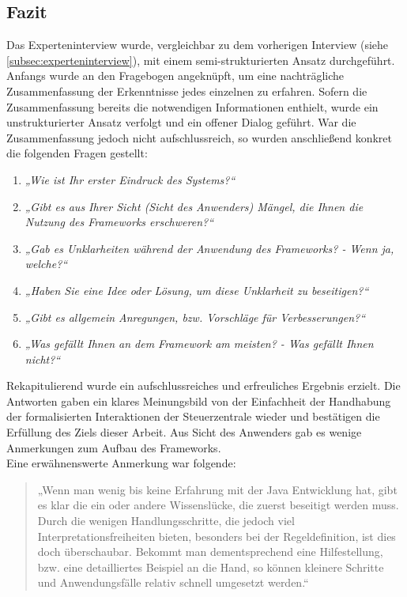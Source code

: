     \subsection{Fazit}
        Das Experteninterview wurde, vergleichbar zu dem vorherigen Interview (siehe \ref{subsec:experteninterview}), mit einem semi-strukturierten Ansatz durchgeführt. 
        Anfangs wurde an den Fragebogen angeknüpft, um eine nachträgliche Zusammenfassung der Erkenntnisse jedes einzelnen zu erfahren. Sofern die Zusammenfassung bereits 
        die notwendigen Informationen enthielt, wurde ein unstrukturierter Ansatz verfolgt und ein offener Dialog geführt. War die Zusammenfassung jedoch nicht 
        aufschlussreich, so wurden anschließend konkret die 
        folgenden Fragen gestellt: 
        \begin{enumerate}
            \item \textit{„Wie ist Ihr erster Eindruck des Systems?“}
            \item \textit{„Gibt es aus Ihrer Sicht (Sicht des Anwenders) Mängel, die Ihnen die Nutzung des Frameworks erschweren?“}
            \item \textit{„Gab es Unklarheiten während der Anwendung des Frameworks? - Wenn ja, welche?“}
            \item \textit{„Haben Sie eine Idee oder Lösung, um diese Unklarheit zu beseitigen?“}
            \item \textit{„Gibt es allgemein Anregungen, bzw. Vorschläge für Verbesserungen?“}
            \item \textit{„Was gefällt Ihnen an dem Framework am meisten? - Was gefällt Ihnen nicht?“}
        \end{enumerate} 
        Rekapitulierend wurde ein aufschlussreiches und erfreuliches Ergebnis erzielt. Die Antworten gaben ein klares Meinungsbild von der Einfachheit der 
        Handhabung der formalisierten Interaktionen der Steuerzentrale wieder und bestätigen die Erfüllung des Ziels dieser Arbeit. 
        Aus Sicht des Anwenders gab es wenige Anmerkungen zum Aufbau des Frameworks. 
        \\
        Eine erwähnenswerte Anmerkung war folgende:
        \begin{quote}
            „Wenn man wenig bis keine Erfahrung mit der Java Entwicklung hat, gibt es klar die ein oder andere Wissenslücke, die zuerst beseitigt werden muss. 
            Durch die wenigen Handlungsschritte, die jedoch viel Interpretationsfreiheiten bieten, besonders bei der Regeldefinition, ist dies doch überschaubar. 
            Bekommt man dementsprechend eine Hilfestellung, bzw. eine detailliertes Beispiel an die Hand, so können kleinere Schritte und Anwendungsfälle 
            relativ schnell umgesetzt werden.“
        \end{quote}
